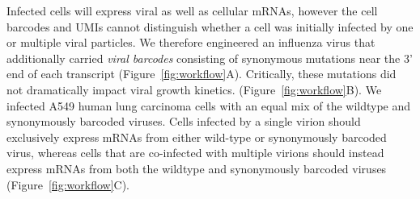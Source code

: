 \documentclass[9pt,lineno]{elife}
\begin{document}
Infected cells will express viral as well as cellular mRNAs, however the cell barcodes and UMIs cannot distinguish whether a cell was initially infected by one or multiple viral particles.
We therefore engineered an influenza virus that additionally carried \emph{viral barcodes} consisting of synonymous mutations near the 3' end of each transcript (Figure~\ref{fig:workflow}A).
Critically, these mutations did not dramatically impact viral growth kinetics. (Figure~\ref{fig:workflow}B).
We infected A549 human lung carcinoma cells with an equal mix of the wildtype and synonymously barcoded viruses.
Cells infected by a single virion should exclusively express mRNAs from either wild-type or synonymously barcoded virus, whereas cells that are co-infected with multiple virions should instead express mRNAs from both the wildtype and synonymously barcoded viruses (Figure~\ref{fig:workflow}C).
\end{document}
